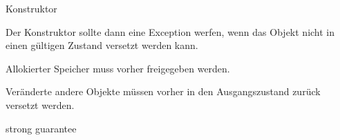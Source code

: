 \begin{frame}{Konstruktor}

    Der Konstruktor sollte dann eine Exception werfen, wenn das Objekt nicht in einen gültigen Zustand versetzt werden kann.
    
    Allokierter Speicher muss vorher freigegeben werden.
    
    Veränderte andere Objekte müssen vorher in den Ausgangszustand zurück versetzt werden.
    
    strong guarantee
    

\end{frame}

